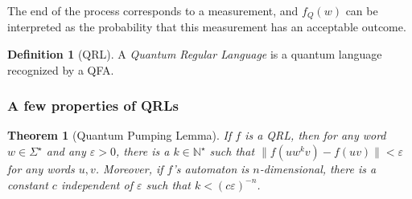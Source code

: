 \documentclass[12pt,a4paper]{article}
\theoremstyle{plain}
\newtheorem*{theorem}{Theorem}
\theoremstyle{definition}
\newtheorem*{definition}{Definition}
\begin{document}
The end of the process corresponds to a measurement, and $f_Q(w)$ can be interpreted as the probability that this measurement has an acceptable outcome. 

\begin{definition}[QRL]
    A \emph{Quantum Regular Language} is a quantum language recognized by a QFA.
\end{definition}

\subsubsection{A few properties of QRLs}
\begin{theorem}[Quantum Pumping Lemma]
    If $f$ is a QRL, then for any word $w\in\Sigma^\star$ and any $\varepsilon > 0$, there is a $k\in \mathbb{N}^\star$ such that $\|f(uw^kv) - f(uv)\| < \varepsilon$ for any words $u, v$. Moreover, if $f$'s automaton is $n$-dimensional, there is a constant $c$ independent of $\varepsilon$ such that $k < (c\varepsilon)^{-n}$.
\end{theorem}
\end{document}
